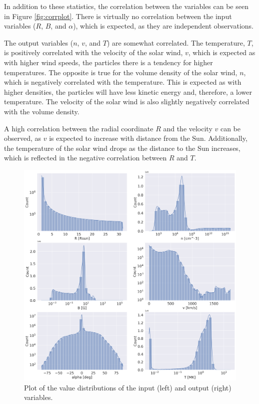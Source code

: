 In addition to these statistics, the correlation between the variables can be seen in Figure \ref{fig:corrplot}. There is virtually no correlation between the input variables ($R$, $B$, and $\alpha$), which is expected, as they are independent observations. 

The output variables ($n$, $v$, and $T$) are somewhat correlated. The temperature, $T$, is positively correlated with the velocity of the solar wind, $v$, which is expected as with higher wind speeds, the particles there is a tendency for higher temperatures. The opposite is true for the volume density of the solar wind, $n$, which is negatively correlated with the temperature. This is expected as with higher densities, the particles will have less kinetic energy and, therefore, a lower temperature. The velocity of the solar wind is also slightly negatively correlated with the volume density.

A high correlation between the radial coordinate $R$ and the velocity $v$ can be observed, as $v$ is expected to increase with distance from the Sun. Additionally, the temperature of the solar wind drops as the distance to the Sun increases, which is reflected in the negative correlation between $R$ and $T$.


\begin{figure}
    \centering
    \includegraphics[width=\textwidth]{figures/joint_var_distribution.png}
    \caption{Plot of the value distributions of the input (left) and output (right) variables.}
    \label{fig:joint_vars_distr}
\end{figure}

